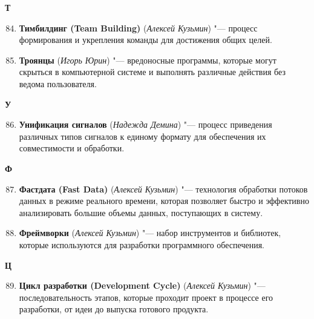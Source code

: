 \begin{flushleft} \large\textbf{Т} \end{flushleft}

\begin{enumerate}
    \setcounter{enumi}{83}

    \item \textbf{Тимбилдинг (Team Building)} (\textit{Алексей Кузьмин}) "--- 
    процесс формирования и укрепления команды для достижения общих целей.

    \item \textbf{Троянцы} (\textit{Игорь Юрин}) "--- 
    вредоносные программы, которые могут скрыться в компьютерной системе и выполнять различные действия без ведома пользователя. 
\end{enumerate}

\begin{flushleft} \large\textbf{У} \end{flushleft}

\begin{enumerate}
    \setcounter{enumi}{85}

    \item \textbf{Унификация сигналов} (\textit{Надежда Демина}) "--- 
    процесс приведения различных типов сигналов к единому формату для обеспечения их совместимости и обработки. 
\end{enumerate}

\begin{flushleft} \large\textbf{Ф} \end{flushleft}

\begin{enumerate}
    \setcounter{enumi}{86}

    \item \textbf{Фастдата (Fast Data)} (\textit{Алексей Кузьмин}) "--- 
    технология обработки потоков данных в режиме реального времени, которая позволяет быстро и эффективно анализировать большие объемы данных, поступающих в систему.

    \item \textbf{Фреймворки} (\textit{Алексей Кузьмин}) "--- 
    набор инструментов и библиотек, которые используются для разработки программного обеспечения.
\end{enumerate}

\begin{flushleft} \large\textbf{Ц} \end{flushleft}

\begin{enumerate}
    \setcounter{enumi}{88}

    \item \textbf{Цикл разработки (Development Cycle)} (\textit{Алексей Кузьмин}) "--- 
    последовательность этапов, которые проходит проект в процессе его разработки, от идеи до выпуска готового продукта. 
\end{enumerate}

